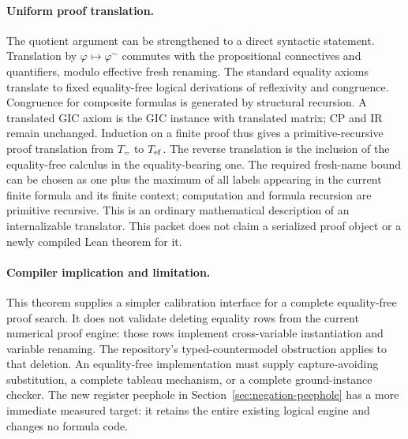 \paragraph{Uniform proof translation.}
The quotient argument can be strengthened to a direct syntactic statement.
Translation by $\varphi\mapsto\varphi^\sim$ commutes with the propositional
connectives and quantifiers, modulo effective fresh renaming.  The standard
equality axioms translate to fixed equality-free logical derivations of
reflexivity and congruence.  Congruence for composite formulas is generated
by structural recursion.  A translated GIC axiom is the GIC instance with
translated matrix; CP and IR remain unchanged.  Induction on a finite proof
thus gives a primitive-recursive proof translation from $T_{=}$ to
$T_{\rm ef}$.  The reverse translation is the inclusion of the equality-free
calculus in the equality-bearing one.  The required fresh-name bound can
be chosen as one plus the maximum of all labels appearing in the current
finite formula and its finite context; computation and formula recursion
are primitive recursive.  This is an ordinary mathematical description of
an internalizable translator.  This packet does not claim a serialized
proof object or a newly compiled Lean theorem for it.

\paragraph{Compiler implication and limitation.}
This theorem supplies a simpler calibration interface for a complete
equality-free proof search.  It does not validate deleting equality rows
from the current numerical proof engine: those rows implement cross-variable
instantiation and variable renaming.  The repository's typed-countermodel
obstruction applies to that deletion.  An equality-free implementation must
supply capture-avoiding substitution, a complete tableau mechanism, or a
complete ground-instance checker.  The new register peephole in
Section~\ref{sec:negation-peephole} has a more immediate measured target:
it retains the entire existing logical engine and changes no formula code.
